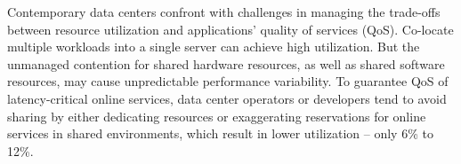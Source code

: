 
\begin{eabstract} 
  Contemporary data centers confront with challenges in
  managing the trade-offs between resource utilization and
  applications’ quality of services (QoS). Co-locate
  multiple workloads into a single server can achieve high
  utilization. But the unmanaged contention for shared
  hardware resources, as well as shared software resources,
  may cause unpredictable performance variability. To
  guarantee QoS of latency-critical online services, data
  center operators or developers tend to avoid sharing by
  either dedicating resources or exaggerating reservations
  for online services in shared environments, which result
  in lower utilization – only 6\% to 12\%.


\end{eabstract}

